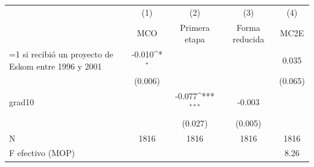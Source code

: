 {
\def\sym#1{\ifmmode^{#1}\else\(^{#1}\)\fi}
\begin{tabular}{l*{4}{c}}
\toprule
                    &\multicolumn{1}{c}{(1)}&\multicolumn{1}{c}{(2)}&\multicolumn{1}{c}{(3)}&\multicolumn{1}{c}{(4)}\\
                    &\multicolumn{1}{c}{MCO}&\multicolumn{1}{c}{Primera etapa}&\multicolumn{1}{c}{Forma reducida}&\multicolumn{1}{c}{MC2E}\\
\midrule
=1 si recibió un proyecto de Eskom entre 1996 y 2001&      -0.010\sym{*}  &                     &                     &       0.035         \\
                    &     (0.006)         &                     &                     &     (0.065)         \\
\addlinespace
grad10              &                     &      -0.077\sym{***}&      -0.003         &                     \\
                    &                     &     (0.027)         &     (0.005)         &                     \\
\midrule
N                   &        1816         &        1816         &        1816         &        1816         \\
F efectivo (MOP)    &                     &                     &                     &        8.26         \\
\bottomrule
\end{tabular}
}
